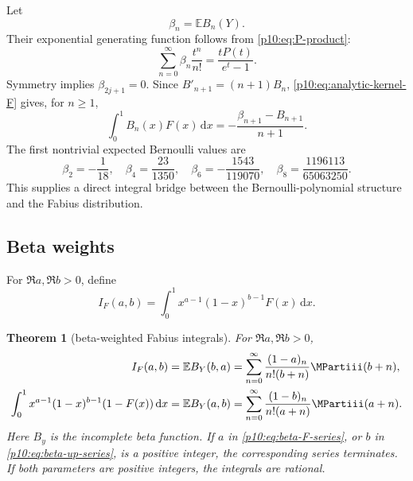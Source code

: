 \documentclass[11pt,oneside]{article}
\newtheorem{theorem}{Theorem}[section]
\theoremstyle{definition}
\theoremstyle{remark}
\newcommand{\F}{F}
\newcommand{\E}{\mathbb E}
\newcommand{\dd}{\,\mathrm d}
\newcommand{\1}{\mathbf 1}
\begin{document}
Let
\begin{equation}\label{p10:eq:beta-n-def}
 \beta_n=\E B_n(Y).
\end{equation}
Their exponential generating function follows from \cref{p10:eq:P-product}:
\begin{equation}\label{p10:eq:beta-egf}
 \sum_{n=0}^{\infty}\beta_n\frac{t^n}{n!}
 =\frac{tP(t)}{e^t-1}.
\end{equation}
Symmetry implies \(\beta_{2j+1}=0\).  Since
\(B'_{n+1}=(n+1)B_n\), \cref{p10:eq:analytic-kernel-F} gives, for \(n\ge1\),
\begin{equation}\label{p10:eq:Bernoulli-F-integral}
 \int_0^1B_n(x)\F(x)\dd x
 =-\frac{\beta_{n+1}-B_{n+1}}{n+1}.
\end{equation}
The first nontrivial expected Bernoulli values are
\begin{equation}\label{p10:eq:beta-values}
 \beta_2=-\frac1{18},\quad
 \beta_4=\frac{23}{1350},\quad
 \beta_6=-\frac{1543}{119070},\quad
 \beta_8=\frac{1196113}{65063250}.
\end{equation}
This supplies a direct integral bridge between the Bernoulli-polynomial structure and
the Fabius distribution.

\subsection{Beta weights}

For \(\Re a,\Re b>0\), define
\begin{equation}\label{p10:eq:IFab}
 I_F(a,b)=\int_0^1x^{a-1}(1-x)^{b-1}\F(x)\dd x.
\end{equation}

\begin{theorem}[beta-weighted Fabius integrals]\label{p10:thm:beta-F}
For \(\Re a,\Re b>0\),
\begin{align}
 I_F(a,b)
 &=\E B_Y(b,a)
 =\sum_{n=0}^{\infty}
 \frac{(1-a)_n}{n!(b+n)}\MPartiii(b+n),
 \label{p10:eq:beta-F-series}\\
 \int_0^1x^{a-1}(1-x)^{b-1}(1-\F(x))\dd x
 &=\E B_Y(a,b)
 =\sum_{n=0}^{\infty}
 \frac{(1-b)_n}{n!(a+n)}\MPartiii(a+n).
 \label{p10:eq:beta-up-series}
\end{align}
Here \(B_y\) is the incomplete beta function.  If \(a\) in
\cref{p10:eq:beta-F-series}, or \(b\) in \cref{p10:eq:beta-up-series}, is a positive integer,
the corresponding series terminates.  If both parameters are positive integers, the
integrals are rational.
\end{theorem}
\end{document}
